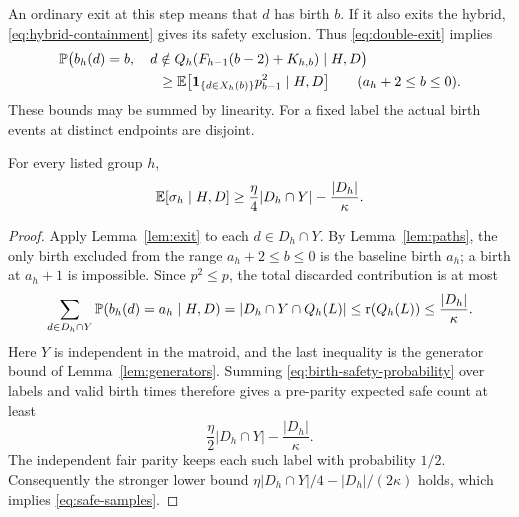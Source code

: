 An ordinary exit at this step means that $d$ has birth $b$. If it also
exits the hybrid, \eqref{eq:hybrid-containment} gives its safety
exclusion. Thus \eqref{eq:double-exit} implies
\begin{equation}\label{eq:birth-safety-probability}
 \begin{split}
 &\Prob\bigl(b_h(d)=b,\quad
       d\notin Q_h(F_{h-1}(b-2)+K_{h,b})\mid H,D\bigr)\\
 &\hspace{25mm}\ge
       \Ex\bigl[\ind{d\in X_h(b)}p_{b-1}^{2}\mid H,D\bigr]
       \qquad(a_h+2\le b\le0).
 \end{split}
\end{equation}
These bounds may be summed by linearity. For a fixed label the actual
birth events at distinct endpoints are disjoint.

\begin{lemma}\label{lem:safe}
For every listed group $h$,
\begin{equation}\label{eq:safe-samples}
 \mathbb E[\sigma_h\mid H,D]
   \ge\frac{\eta}{4}|D_h\cap Y|-\frac{|D_h|}{\kappa}.
\end{equation}
\end{lemma}
\begin{proof}
Apply Lemma~\ref{lem:exit} to each $d\in D_h\cap Y$. By
Lemma~\ref{lem:paths}, the only birth excluded from the range
$a_h+2\le b\le0$ is the baseline birth $a_h$; a birth at $a_h+1$ is
impossible. Since $p^2\le p$, the total discarded contribution is at
most
\[
 \sum_{d\in D_h\cap Y}\mathbb P(b_h(d)=a_h\mid H,D)
   =|D_h\cap Y\cap Q_h(L)|
   \le\operatorname{r}(Q_h(L))\le\frac{|D_h|}{\kappa}.
\]
Here $Y$ is independent in the matroid, and the last inequality is the
generator bound of Lemma~\ref{lem:generators}. Summing
\eqref{eq:birth-safety-probability} over labels and valid birth times
therefore gives a pre-parity expected safe count at least
\[
 \frac{\eta}{2}|D_h\cap Y|-\frac{|D_h|}{\kappa}.
\]
The independent fair parity keeps each such label with probability
$1/2$. Consequently the stronger lower bound
$\eta|D_h\cap Y|/4-|D_h|/(2\kappa)$ holds, which implies
\eqref{eq:safe-samples}.
\end{proof}
